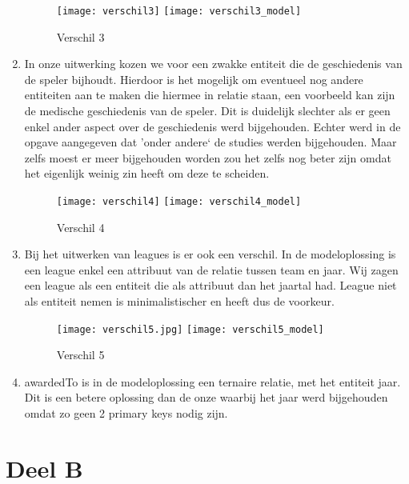 \documentclass[a4paper,kulak]{kulakarticle}
\begin{document}
\begin{enumerate}
		\begin{figure}[!htb]
			\centering
			\texttt{[image: verschil3]}
			\texttt{[image: verschil3\_model]}
			\caption{Verschil 3}
			\label{fig:verschil3}
		\end{figure}
	\item In onze uitwerking kozen we voor een zwakke entiteit die de geschiedenis van de speler bijhoudt. Hierdoor is het mogelijk om eventueel nog andere entiteiten aan te maken die hiermee in relatie staan, een voorbeeld kan zijn de medische geschiedenis van de speler. Dit is duidelijk slechter als er geen enkel ander aspect over de geschiedenis werd bijgehouden.
	Echter werd in de opgave aangegeven dat 'onder andere` de studies werden bijgehouden. 
	Maar zelfs moest er meer bijgehouden worden zou het zelfs nog beter zijn omdat het eigenlijk weinig zin heeft om deze te scheiden.
	
	
		\begin{figure}[!htb]
			\centering
			\texttt{[image: verschil4]}
			\texttt{[image: verschil4\_model]}
			\caption{Verschil 4}
			\label{fig:verschil4}
		\end{figure}
	\item Bij het uitwerken van leagues is er ook een verschil. In de modeloplossing is een league enkel een attribuut van de relatie tussen team en jaar. Wij zagen een league als een entiteit die als attribuut dan het jaartal had. 
	League niet als entiteit nemen is minimalistischer en heeft dus de voorkeur.

\begin{figure}[!htb]
	\centering
	\texttt{[image: verschil5.jpg]}
	\texttt{[image: verschil5\_model]}
	\caption{Verschil 5}
	\label{fig:verschil5}
\end{figure}

	\item awardedTo is in de modeloplossing een ternaire relatie, met het entiteit jaar. Dit is een betere oplossing dan de onze waarbij het jaar werd bijgehouden omdat zo geen 2 primary keys nodig zijn.
	
	
	
\end{enumerate}

\section{Deel B}
\end{document}
